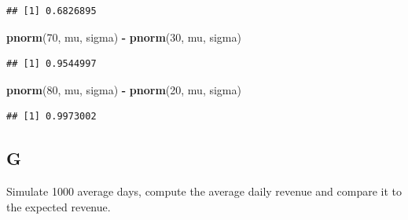 \documentclass[
]{article}
\newenvironment{Shaded}{\begin{snugshade}}{\end{snugshade}}
\newcommand{\DecValTok}[1]{\textcolor[rgb]{0.00,0.00,0.81}{#1}}
\newcommand{\KeywordTok}[1]{\textcolor[rgb]{0.13,0.29,0.53}{\textbf{#1}}}
\newcommand{\NormalTok}[1]{#1}
\newcommand{\OperatorTok}[1]{\textcolor[rgb]{0.81,0.36,0.00}{\textbf{#1}}}
\newcommand{\StringTok}[1]{\textcolor[rgb]{0.31,0.60,0.02}{#1}}
\begin{document}
\begin{verbatim}
## [1] 0.6826895
\end{verbatim}

\begin{Shaded}
\begin{Highlighting}[]
\KeywordTok{pnorm}\NormalTok{(}\DecValTok{70}\NormalTok{, mu, sigma) }\OperatorTok{{-}}\StringTok{ }\KeywordTok{pnorm}\NormalTok{(}\DecValTok{30}\NormalTok{, mu, sigma)}
\end{Highlighting}
\end{Shaded}

\begin{verbatim}
## [1] 0.9544997
\end{verbatim}

\begin{Shaded}
\begin{Highlighting}[]
\KeywordTok{pnorm}\NormalTok{(}\DecValTok{80}\NormalTok{, mu, sigma) }\OperatorTok{{-}}\StringTok{ }\KeywordTok{pnorm}\NormalTok{(}\DecValTok{20}\NormalTok{, mu, sigma)}
\end{Highlighting}
\end{Shaded}

\begin{verbatim}
## [1] 0.9973002
\end{verbatim}

\hypertarget{g}{%
\subsection{G}\label{g}}

Simulate 1000 average days, compute the average daily revenue and
compare it to the expected revenue.
\end{document}
